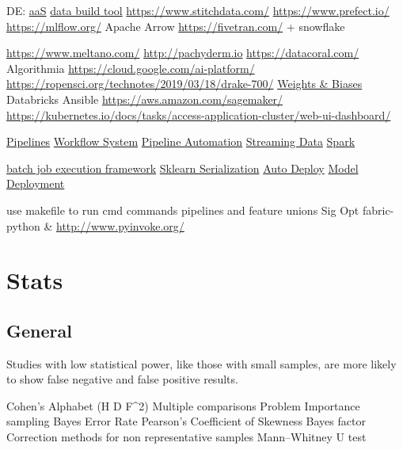 \documentclass[]{book}
\begin{document}
DE: \href{https://www.astronomer.io/}{aaS} \href{https://www.getdbt.com/}{data build tool} \url{https://www.stitchdata.com/} \url{https://www.prefect.io/} \url{https://mlflow.org/} Apache Arrow \url{https://fivetran.com/} + snowflake

\url{https://www.meltano.com/} \url{http://pachyderm.io} \url{https://datacoral.com/} Algorithmia \url{https://cloud.google.com/ai-platform/} \url{https://ropensci.org/technotes/2019/03/18/drake-700/} \href{https://www.wandb.com/blog/towards-reproducibility}{Weights \& Biases} Databricks Ansible \url{https://aws.amazon.com/sagemaker/} \url{https://kubernetes.io/docs/tasks/access-application-cluster/web-ui-dashboard/}

\href{http://stat545.com/automation01_slides/\#/automating-data-analysis-pipelines}{Pipelines} \href{https://snakemake.readthedocs.io/en/stable/}{Workflow System} \href{http://stat545.com/automation01_slides/\#/automating-data-analysis-pipelines}{Pipeline Automation} \href{https://www.wallaroolabs.com}{Streaming Data} \href{https://docs.azuredatabricks.net/spark/latest/mllib/mllib-pipelines-and-stuctured-streaming.html}{Spark}

\href{https://stitchfix.github.io/flotilla-os/}{batch job execution framework} \href{https://cmry.github.io/notes/serialize}{Sklearn Serialization} \href{http://content.nexosis.com/twimlai}{Auto Deploy} \href{https://orchestrahq.com}{Model Deployment}

use makefile to run cmd commands pipelines and feature unions Sig Opt fabric-python \& \url{http://www.pyinvoke.org/}

\hypertarget{stats}{%
\chapter{Stats}\label{stats}}

\hypertarget{general-3}{%
\section{General}\label{general-3}}

Studies with low statistical power, like those with small samples, are more likely to show false negative and false positive results.

Cohen's Alphabet (H D F\^{}2) Multiple comparisons Problem Importance sampling Bayes Error Rate Pearson's Coefficient of Skewness Bayes factor Correction methods for non representative samples Mann--Whitney U test
\end{document}
